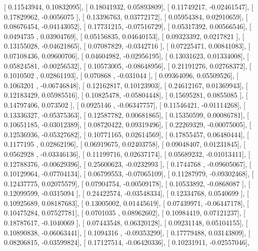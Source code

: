 \documentclass{article}
\begin{document}
       [ 0.11543944,  0.10832095],
       [ 0.18041932,  0.05893809],
       [ 0.11749217, -0.02461547],
       [ 0.17829962, -0.0056075 ],
       [ 0.13396763,  0.03772172],
       [ 0.05954384,  0.02910659],
       [ 0.08676454, -0.04143052],
       [ 0.17731215, -0.07516729],
       [ 0.05317392,  0.00566546],
       [ 0.0494735 ,  0.03904769],
       [ 0.05156835,  0.04640153],
       [ 0.09323392,  0.0217821 ],
       [ 0.13155028, -0.04621865],
       [ 0.07087829, -0.0342716 ],
       [ 0.07225471,  0.00841083],
       [ 0.07108436,  0.09600706],
       [ 0.04604982, -0.02956195],
       [ 0.13031623,  0.01334008],
       [ 0.05824581, -0.00256532],
       [ 0.10573005, -0.08648956],
       [ 0.21191276,  0.02768372],
       [ 0.1010502 ,  0.02861193],
       [ 0.070868  , -0.031044  ],
       [ 0.09364096,  0.05509526],
       [ 0.1063201 , -0.06746848],
       [ 0.12162817,  0.10123903],
       [ 0.24612167,  0.01369943],
       [ 0.12183429,  0.05985516],
       [ 0.10825478, -0.05804448],
       [ 0.15695281,  0.0855085 ],
       [ 0.14797406,  0.073502  ],
       [ 0.0925146 , -0.06347757],
       [ 0.11546421, -0.01114268],
       [ 0.13336327, -0.05375363],
       [ 0.12587782,  0.00681865],
       [ 0.15350599,  0.00086781],
       [ 0.10651185, -0.03012389],
       [ 0.08720422,  0.09319496],
       [ 0.22269329, -0.00075005],
       [ 0.12536936, -0.05327682],
       [ 0.10771165,  0.02614569],
       [ 0.17855457,  0.06480444],
       [ 0.1177195 ,  0.02862196],
       [ 0.06919675,  0.02403758],
       [ 0.09048407,  0.01231845],
       [ 0.0562928 , -0.03346136],
       [ 0.11199716,  0.02637174],
       [ 0.05689232, -0.01013411],
       [ 0.12788376, -0.00629396],
       [ 0.25600623, -0.0232993 ],
       [ 0.1744768 , -0.09605067],
       [ 0.10129964, -0.07704134],
       [ 0.06799553, -0.07065109],
       [ 0.11287979, -0.09302468],
       [ 0.12437775,  0.02075579],
       [ 0.07904754, -0.00509178],
       [ 0.10533892, -0.0868087 ],
       [ 0.12099599, -0.0315094 ],
       [ 0.24422574, -0.03548334],
       [ 0.12334768,  0.0540699 ],
       [ 0.10925689,  0.08187683],
       [ 0.13005002,  0.01445619],
       [ 0.07439971, -0.06447178],
       [ 0.10475284,  0.07527781],
       [ 0.0701035 ,  0.08962602],
       [ 0.10984419,  0.07121237],
       [ 0.18787617, -0.1040069 ],
       [ 0.07443548,  0.06320128],
       [ 0.09231148,  0.05104155],
       [ 0.10890838, -0.06063441],
       [ 0.1094316 , -0.09353299],
       [ 0.17779488,  0.03143809],
       [ 0.08206815, -0.03599824],
       [ 0.17127514, -0.06420336],
       [ 0.10231911, -0.02557046],
\end{document}

